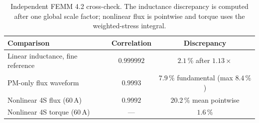\documentclass[review]{elsarticle}
\begin{document}
\begin{table}[t]
\centering\small
\caption{Independent FEMM 4.2 cross-check. The inductance discrepancy is
computed after one global scale factor; nonlinear flux is pointwise and
torque uses the weighted-stress integral.}
\label{tab:femmcheck}
\begin{tabular}{lcc}
\toprule
Comparison & Correlation & Discrepancy \\
\midrule
Linear inductance, fine reference & $0.999992$ & $2.1\,\%$ after $1.13\times$ \\
PM-only flux waveform & $0.9993$ & $7.9\,\%$ fundamental (max $8.4\,\%$) \\
Nonlinear 4S flux (60\,A) & $0.9992$ & $20.2\,\%$ mean pointwise \\
Nonlinear 4S torque (60\,A) & --- & $1.6\,\%$ \\
\bottomrule
\end{tabular}
\end{table}

\begin{table}[t]
\centering\small
\caption{Two surrogate families on the same unseen trajectories. Entries are
flux $R^2$ / torque $R^2$ against FEMM; the last column is torque agreement
between the MLP and co-energy predictions.}
\label{tab:crossmodel}
\end{table}

\begin{table}[t]
\centering\small
\caption{Three-level FEMM refinement at representative operating points.
The last two levels use a $0.7$\,mm block mesh, $3^\circ$ arc segments
and the same circuit conventions.}
\label{tab:femmmesh}
\end{table}
\end{document}
